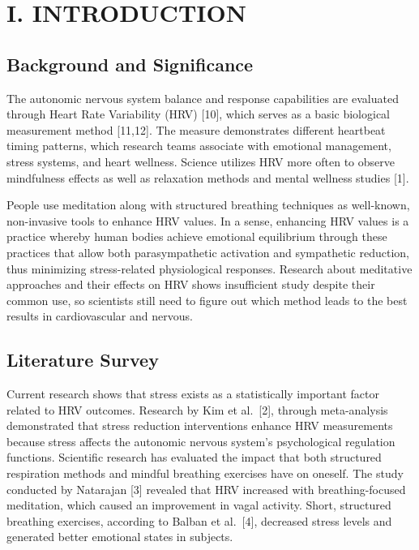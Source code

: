 \documentclass[
  11pt,
]{ieee}
\begin{document}
\section{I. INTRODUCTION}\label{i.-introduction}

\subsection{Background and
Significance}\label{background-and-significance}

\vspace{0.8em}

The autonomic nervous system balance and response capabilities are
evaluated through Heart Rate Variability (HRV) {[}10{]}, which serves as
a basic biological measurement method {[}11,12{]}. The measure
demonstrates different heartbeat timing patterns, which research teams
associate with emotional management, stress systems, and heart wellness.
Science utilizes HRV more often to observe mindfulness effects as well
as relaxation methods and mental wellness studies {[}1{]}.

People use meditation along with structured breathing techniques as
well-known, non-invasive tools to enhance HRV values. In a sense,
enhancing HRV values is a practice whereby human bodies achieve
emotional equilibrium through these practices that allow both
parasympathetic activation and sympathetic reduction, thus minimizing
stress-related physiological responses. Research about meditative
approaches and their effects on HRV shows insufficient study despite
their common use, so scientists still need to figure out which method
leads to the best results in cardiovascular and nervous.

\subsection{Literature Survey}\label{literature-survey}

\vspace{0.8em}

Current research shows that stress exists as a statistically important
factor related to HRV outcomes. Research by Kim et al.~{[}2{]}, through
meta-analysis demonstrated that stress reduction interventions enhance
HRV measurements because stress affects the autonomic nervous system's
psychological regulation functions. Scientific research has evaluated
the impact that both structured respiration methods and mindful
breathing exercises have on oneself. The study conducted by Natarajan
{[}3{]} revealed that HRV increased with breathing-focused meditation,
which caused an improvement in vagal activity. Short, structured
breathing exercises, according to Balban et al.~{[}4{]}, decreased
stress levels and generated better emotional states in subjects.
\end{document}
